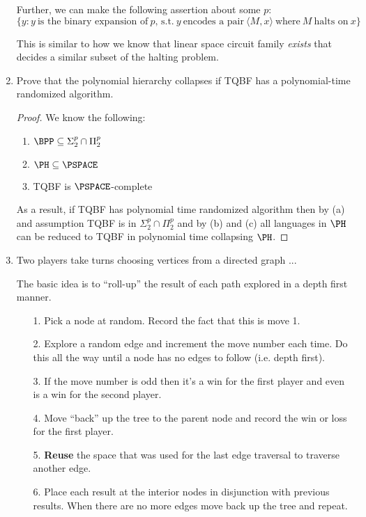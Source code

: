 \documentclass[usletter]{article}
\begin{document}
\begin{enumerate}
    Further, we can make the following assertion about some $p$:
    \begin{equation*}
      \{ y : y\ \text{is the binary expansion of}\ p\text{, s.t.}\ y\ \text{encodes a pair}\ \langle M, x \rangle\ \text{where}\ M\ \text{halts on}\ x \}
    \end{equation*}

    This is similar to how we know that linear space circuit family \textit{exists} that decides a similar subset of the halting problem.

  \item Prove that the polynomial hierarchy collapses if TQBF has a polynomial-time randomized algorithm.

    \begin{proof}
      We know the following:

      \begin{enumerate}
        \item $\BPP \subseteq \Sigma_{2}^{p} \cap \Pi_{2}^{p}$
        \item $\PH \subseteq \PSPACE$
        \item TQBF is $\PSPACE$-complete
      \end{enumerate}

      As a result, if TQBF has polynomial time randomized algorithm then by (a) and assumption TQBF is in $\Sigma_{2}^{p} \cap \Pi_{2}^{p}$ and by (b) and (c) all languages in $\PH$ can be reduced to TQBF in polynomial time collapsing $\PH$.
    \end{proof}

  \item Two players take turns choosing vertices from a directed graph ...

    The basic idea is to ``roll-up'' the result of each path explored in a depth first manner.

   \begin{itemize}
     \item[1.] Pick a node at random. Record the fact that this is move 1.
     \item[2.] Explore a random edge and increment the move number each time. Do this all the way until a node has no edges to follow (i.e. depth first).
     \item[3.] If the move number is odd then it's a win for the first player and even is a win for the second player.
     \item[4.] Move ``back'' up the tree to the parent node and record the win or loss for the first player.
     \item[5.] \textbf{Reuse} the space that was used for the last edge traversal to traverse another edge.
     \item[6.] Place each result at the interior nodes in disjunction with previous results. When there are no more edges move back up the tree and repeat.
   \end{itemize}


\end{enumerate}
\end{document}

